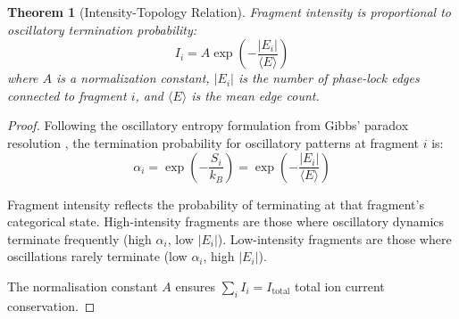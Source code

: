 \documentclass[twocolumn,10pt,a4paper]{article}
\newtheorem{theorem}{Theorem}
\theoremstyle{definition}
\theoremstyle{remark}
\begin{document}
\begin{theorem}[Intensity-Topology Relation]
\label{thm:intensity_topology}
Fragment intensity is proportional to oscillatory termination probability:
\begin{equation}
I_i = A \exp\left(-\frac{|E_i|}{\langle E \rangle}\right)
\end{equation}
where $A$ is a normalization constant, $|E_i|$ is the number of phase-lock edges connected to fragment $i$, and $\langle E \rangle$ is the mean edge count.
\end{theorem}

\begin{proof}
Following the oscillatory entropy formulation from Gibbs' paradox resolution \cite{sachikonye2024gibbs}, the termination probability for oscillatory patterns at fragment $i$ is:
\begin{equation}
\alpha_i = \exp\left(-\frac{S_i}{k_B}\right) = \exp\left(-\frac{|E_i|}{\langle E \rangle}\right)
\end{equation}

Fragment intensity reflects the probability of terminating at that fragment's categorical state. High-intensity fragments are those where oscillatory dynamics terminate frequently (high $\alpha_i$, low $|E_i|$). Low-intensity fragments are those where oscillations rarely terminate (low $\alpha_i$, high $|E_i|$).

The normalisation constant $A$ ensures $\sum_i I_i = I_{\text{total}}$ total ion current conservation.
\end{proof}
\end{document}
